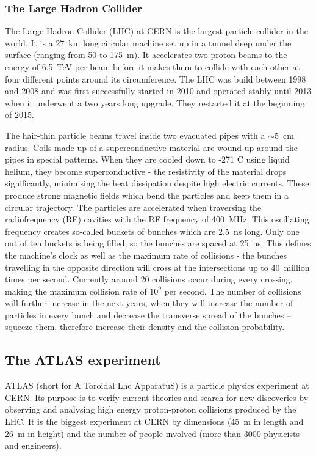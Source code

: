 \documentclass[12pt]{packages/mytustyle}  %
\begin{document}
\subsubsection{The Large Hadron Collider}
The Large Hadron Collider (LHC) at CERN is the largest particle collider in the world. It is a 27~km long circular machine set up in a tunnel deep under the surface (ranging from 50 to 175~m). It accelerates two proton beams to the energy of 6.5~TeV per beam before it makes them to collide with each other at four different points around its circumference. The LHC was build between 1998 and 2008 and was first successfully started in 2010 and operated stably until 2013 when it underwent a two years long upgrade. They restarted it at the beginning of 2015.

The hair-thin particle beams travel inside two evacuated pipes with a $\sim$5~cm radius. Coils made up of a superconductive material are wound up around the pipes in special patterns. When they are cooled down to -271 \textdegree C using liquid helium, they become superconductive - the resistivity of the material drops significantly, minimising the heat dissipation despite high electric currents. These produce strong magnetic fields which bend the particles and keep them in a circular trajectory. The particles are accelerated when traversing the radiofrequency (RF) cavities with the RF frequency of 400~MHz. This oscillating frequency creates so-called buckets of bunches which are 2.5~ns long. Only one out of ten buckets is being filled, so the bunches are spaced at 25~ns. This defines the machine's clock as well as the maximum rate of collisions - the bunches travelling in the opposite direction will cross at the intersections up to 40~million times per second. Currently around 20 collisions occur during every crossing, making the maximum collision rate of $10^9$ per second. The number of collisions will further increase in the next years, when they will increase the number of particles in every bunch and decrease the transverse spread of the bunches -- squeeze them, therefore increase their density and the collision probability.

\subsection{The ATLAS experiment}
ATLAS (short for A Toroidal Lhc ApparatuS) is a particle physics experiment at CERN. Its purpose is to verify current theories and search for new discoveries by observing and analysing high energy proton-proton collisions produced by the LHC. It is the biggest experiment at CERN by dimensions (45~m in length and 26~m in height) and the number of people involved (more than 3000 physicists and engineers).
\end{document}
